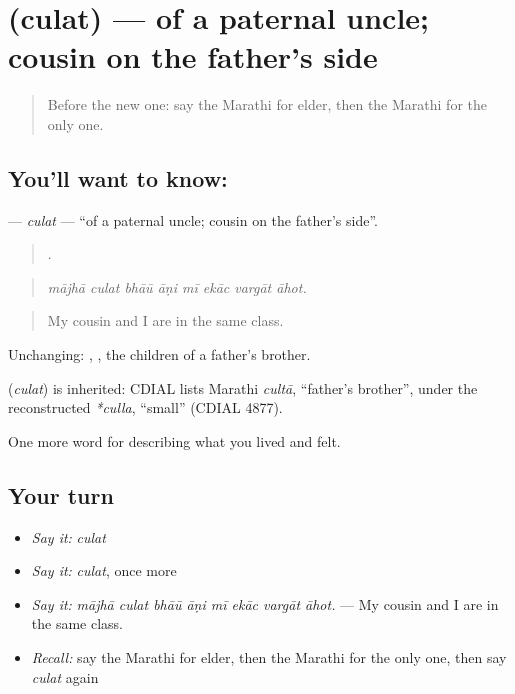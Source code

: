 \section[\texorpdfstring{\mr{चुलत} (culat)}{चुलत (culat)}]{ (culat) — of a paternal uncle; cousin on the father's side}

\label{lesson:MR-C497-culat}



\begin{quote}
Before the new one: say the Marathi for elder, then the Marathi for the only one.
\end{quote}

\subsection*{You'll want to know: }
\textbf{} — \emph{culat} — \textquotedblleft{}of a paternal uncle; cousin on the father's side\textquotedblright{}.

\begin{quote}
       .
\end{quote}

\begin{quote}
\emph{mājhā culat bhāū āṇi mī ekāc vargāt āhot.}
\end{quote}

\begin{quote}
My cousin and I are in the same class.
\end{quote}

Unchanging:  ,  , the children of a father's brother.

\begin{cousinweb}
\textbf{} (\emph{culat}) is inherited: CDIAL lists Marathi \emph{cultā}, \textquotedblleft{}father's brother\textquotedblright{}, under the reconstructed \emph{*culla}, \textquotedblleft{}small\textquotedblright{} (CDIAL 4877).
\end{cousinweb}

\begin{grammarlens}[title={What you've built}]
One more word for describing what you lived and felt.
\end{grammarlens}

\subsection*{Your turn}
\begin{itemize}
\raggedright
  \item \emph{Say it:} \emph{culat}
  \item \emph{Say it:} \emph{culat}, once more
  \item \emph{Say it:} \emph{mājhā culat bhāū āṇi mī ekāc vargāt āhot.} — My cousin and I are in the same class.
  \item \emph{Recall:} say the Marathi for elder, then the Marathi for the only one, then say \emph{culat} again
\end{itemize}

